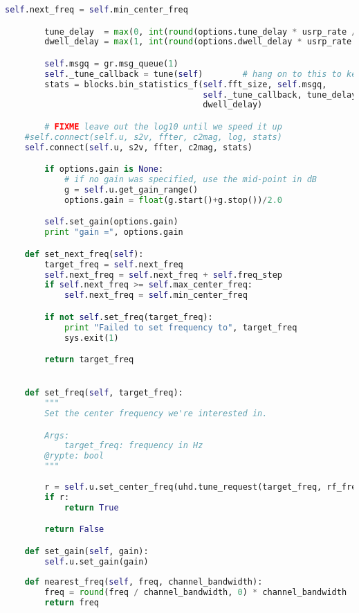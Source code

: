 \begin{lstlisting}[language=Python]
        self.next_freq = self.min_center_freq

        tune_delay  = max(0, int(round(options.tune_delay * usrp_rate / self.fft_size)))  # in fft_frames
        dwell_delay = max(1, int(round(options.dwell_delay * usrp_rate / self.fft_size))) # in fft_frames

        self.msgq = gr.msg_queue(1)
        self._tune_callback = tune(self)        # hang on to this to keep it from being GC'd
        stats = blocks.bin_statistics_f(self.fft_size, self.msgq,
                                        self._tune_callback, tune_delay,
                                        dwell_delay)

        # FIXME leave out the log10 until we speed it up
    #self.connect(self.u, s2v, ffter, c2mag, log, stats)
    self.connect(self.u, s2v, ffter, c2mag, stats)

        if options.gain is None:
            # if no gain was specified, use the mid-point in dB
            g = self.u.get_gain_range()
            options.gain = float(g.start()+g.stop())/2.0

        self.set_gain(options.gain)
        print "gain =", options.gain

    def set_next_freq(self):
        target_freq = self.next_freq
        self.next_freq = self.next_freq + self.freq_step
        if self.next_freq >= self.max_center_freq:
            self.next_freq = self.min_center_freq

        if not self.set_freq(target_freq):
            print "Failed to set frequency to", target_freq
            sys.exit(1)

        return target_freq


    def set_freq(self, target_freq):
        """
        Set the center frequency we're interested in.

        Args:
            target_freq: frequency in Hz
        @rypte: bool
        """
        
        r = self.u.set_center_freq(uhd.tune_request(target_freq, rf_freq=(target_freq + self.lo_offset),rf_freq_policy=uhd.tune_request.POLICY_MANUAL))
        if r:
            return True

        return False

    def set_gain(self, gain):
        self.u.set_gain(gain)
    
    def nearest_freq(self, freq, channel_bandwidth):
        freq = round(freq / channel_bandwidth, 0) * channel_bandwidth
        return freq


\end{lstlisting}

